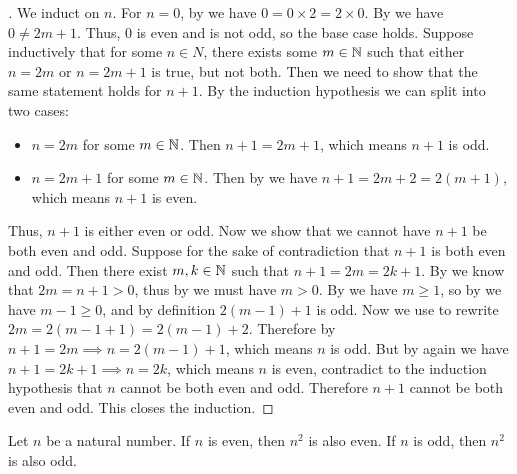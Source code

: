 \begin{proof}[]
  We induct on \(n\).
  For \(n = 0\), by  we have \(0 = 0 \times 2 = 2 \times 0\).
  By  we have \(0 \neq 2m + 1\).
  Thus, \(0\) is even and is not odd, so the base case holds.
  Suppose inductively that for some \(n \in N\), there exists some \(m \in \mathbb{N}\) such that either \(n = 2m\) or \(n = 2m + 1\) is true, but not both.
  Then we need to show that the same statement holds for \(n + 1\).
  By the induction hypothesis we can split into two cases:
  \begin{itemize}
    \item \(n = 2m\) for some \(m \in \mathbb{N}\).
          Then \(n + 1 = 2m + 1\), which means \(n + 1\) is odd.
    \item \(n = 2m + 1\) for some \(m \in \mathbb{N}\).
          Then by  we have \(n + 1 = 2m + 2 = 2(m + 1)\), which means \(n + 1\) is even.
  \end{itemize}
  Thus, \(n + 1\) is either even or odd.
  Now we show that we cannot have \(n + 1\) be both even and odd.
  Suppose for the sake of contradiction that \(n + 1\) is both even and odd.
  Then there exist \(m, k \in \mathbb{N}\) such that \(n + 1 = 2m = 2k + 1\).
  By  we know that \(2m = n + 1 > 0\), thus by  we must have \(m > 0\).
  By  we have \(m \geq 1\), so by  we have \(m - 1 \geq 0\), and by definition \(2(m - 1) + 1\) is odd.
  Now we use  to rewrite \(2m = 2 (m - 1 + 1) = 2 (m - 1) + 2\).
  Therefore by  \(n + 1 = 2m \implies n = 2 (m - 1) + 1\), which means \(n\) is odd.
  But by  again we have \(n + 1 = 2k + 1 \implies n = 2k\), which means \(n\) is even, contradict to the induction hypothesis that \(n\) cannot be both even and odd.
  Therefore \(n + 1\) cannot be both even and odd.
  This closes the induction.
\end{proof}

\begin{ac}\label{i:ac:4.4.3}
  Let \(n\) be a natural number.
  If \(n\) is even, then \(n^2\) is also even.
  If \(n\) is odd, then \(n^2\) is also odd.
\end{ac}

